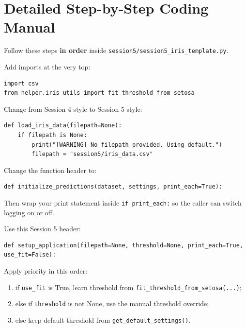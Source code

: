 
\section{Detailed Step-by-Step Coding Manual}

Follow these steps \textbf{in order} inside \texttt{session5/session5\_iris\_template.py}.

\begin{tcolorbox}[title=Do: Add Imports]
Add imports at the very top:
\begin{verbatim}
import csv
from helper.iris_utils import fit_threshold_from_setosa
\end{verbatim}
\end{tcolorbox}

\begin{tcolorbox}[title=Do: Update Data Loading to Support Defaults]
Change from Session 4 style to Session 5 style:
\begin{verbatim}
def load_iris_data(filepath=None):
    if filepath is None:
        print("[WARNING] No filepath provided. Using default.")
        filepath = "session5/iris_data.csv"
\end{verbatim}
\end{tcolorbox}

\begin{tcolorbox}[title=Do: Add Optional Output Control in initialize\_predictions]
Change the function header to:
\begin{verbatim}
def initialize_predictions(dataset, settings, print_each=True):
\end{verbatim}
Then wrap your print statement inside \texttt{if print\_each:} so the caller can switch logging on or off.
\end{tcolorbox}

\begin{tcolorbox}[title=Do: Upgrade setup\_application]
Use this Session 5 header:
\begin{verbatim}
def setup_application(filepath=None, threshold=None, print_each=True, use_fit=False):
\end{verbatim}
Apply priority in this order:
\begin{enumerate}
    \item if \texttt{use\_fit} is True, learn threshold from \texttt{fit\_threshold\_from\_setosa(...)};
    \item else if \texttt{threshold} is not None, use the manual threshold override;
    \item else keep default threshold from \texttt{get\_default\_settings()}.
\end{enumerate}
\end{tcolorbox}


